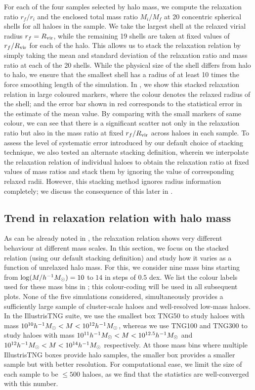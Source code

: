 For each of the four samples selected by halo mass, we compute the relaxation ratio $r_f/r_i$ and the enclosed total mass ratio $M_i/M_f$ at 20 concentric spherical shells for all haloes in the sample. We take the largest shell at the relaxed virial radius $r_f=R_{\rm{vir}}$, while the remaining 19 shells are taken at fixed values of $r_f/R_{\rm{vir}}$ for each of the halo. This allows us to stack the relaxation relation by simply taking the mean and standard deviation of the relaxation ratio and mass ratio at each of the 20 shells. While the physical size of the shell differs from halo to halo, we ensure that the smallest shell has a radius of at least 10 times the force smoothing length of the simulation. In , we show this stacked relaxation relation in large coloured markers, where the colour denotes the relaxed radius of the shell; and the error bar shown in red corresponds to the statistical error in the estimate of the mean value. 
By comparing with the small markers of same colour, we can see that there is a significant scatter not only in the relaxation ratio but also in the mass ratio at fixed $r_f/R_{\rm{vir}}$ across haloes in each sample. 
To assess the level of systematic error introduced by our default choice of stacking technique, we also tested an alternate stacking definition, wherein we interpolate the relaxation relation of individual haloes to obtain the relaxation ratio at fixed values of mass ratios and stack them 
by ignoring the value of corresponding relaxed radii.
However, this stacking method ignores radius information completely; we discuss the consequence of this later in .




\subsection{Trend in relaxation relation with halo mass}
\label{sec:results-mass-ch:simbase}
As can be already noted in , the relaxation relation shows very different behaviour at different mass scales. In this section, we focus on the stacked relation (using our default stacking definition) and study how it varies as a function of unrelaxed halo mass. For this, we consider nine mass bins starting from $\log (M/h^{-1}M_{\odot}) = 10$ to $14$ in steps of $0.5$ dex. We list the colour labels used for these mass bins in ; this colour-coding will be used in all subsequent plots. None of the five simulations considered, simultaneously provides a sufficiently large sample of cluster-scale haloes and well-resolved low-mass haloes.
In the IllustrisTNG suite, we use the smallest box TNG50 to study haloes with mass $10^{10} h^{-1}M_{\odot} < M < 10^{12} h^{-1}M_{\odot}$, whereas we use TNG100 and TNG300 to study haloes with mass $10^{11} h^{-1}M_{\odot} < M < 10^{12.5} h^{-1}M_{\odot}$ and $10^{12} h^{-1}M_{\odot} < M < 10^{14} h^{-1}M_{\odot}$ respectively. At those mass bins where multiple IllustrisTNG boxes provide halo samples, the smaller box provides a smaller sample but with better resolution. For computational ease, we limit the size of each sample to be $\leq500$ haloes, as we find that the statistics are well-converged with this number.


